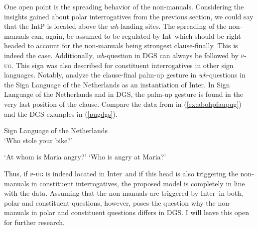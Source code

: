 One open point is the spreading behavior of the non-manuals. Considering the insights gained about polar interrogatives from the previous section, we could say that the IntP is located above the \textit{wh}-landing sites. The spreading of the non-manuals can, again, be assumed to be regulated by Int\textdegree\ which should be right-headed to account for the non-manuals being strongest clause-finally. This is indeed the case. Additionally, \textit{wh}-question in DGS can always be followed by \textsc{p-ug}. This sign was also described for constituent interrogatives in other sign languages. Notably, \citet{aboh2010sa} analyze the clause-final palm-up gesture in \textit{wh}-questions in the Sign Language of the Netherlands as an instantiation of Inter\textdegree . In Sign Language of the Netherlands and in DGS, the palm-up gesture is found in the very last position of the clause. Compare the data from \citet[111]{aboh2010sa} in (\ref{ex:abohpfaupug}) and the DGS examples in (\ref{pugdgs}).

\begin{exe}
\ex Sign Language of the Netherlands \citep[111]{aboh2010sa} \\ 
\glt `Who stole your bike?' \label{ex:abohpfaupug} 
\end{exe}

\begin{exe}
\ex\label{pugdgs}
\begin{xlist} 
\ex {}
\glt `At whom is Maria angry?' \label{ex:pugdgsa} 
\ex {}
\glt `Who is angry at Maria?' \label{ex:pugdgsb} 
\end{xlist}
\end{exe}

\noindent Thus, if \textsc{p-ug} is indeed located in Inter\textdegree\ and if this head is also triggering the non-manuals in constituent interrogatives, the proposed model is completely in line with the data. Assuming that the non-manuals are triggered by Inter\textdegree\ in both, polar and constituent questions, however, poses the question why the non-manuals in polar and constituent questions differs in DGS. I will leave this open for further research.   %

